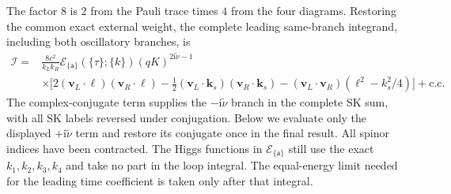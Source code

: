 \documentclass[a4paper,12pt]{article}
\newcommand{\ii}{\mathrm i}
\newcommand{\mb}{\mathbf}
\newcommand{\tn}{\tilde\nu}
\def\aa{\mathsf a}
\newcommand{\bk}{\mb k}
\begin{document}
The factor $8$ is $2$ from the Pauli trace times $4$ from the four
diagrams. Restoring the common exact external weight, the complete
leading same-branch integrand, including both oscillatory branches, is
\begin{align}
 \mathcal I
 ={}&\frac{8c^2}{k_Lk_R}\mathcal E_{\{\aa\}}(\{\tau\};\{k\})
 (qK)^{2\ii\tn-1}\nonumber\\
 &\times\Big[
 2(\mb v_L\cdot\bm\ell)(\mb v_R\cdot\bm\ell)
 -\tfrac12(\mb v_L\cdot\bk_s)(\mb v_R\cdot\bk_s)
 -(\mb v_L\cdot\mb v_R)(\ell^2-k_s^2/4)\Big]
 +\mathrm{c.c.}
 \label{eq:complete-direct-integrand}
\end{align}
The complex-conjugate term supplies the $-\ii\tn$ branch in the complete
SK sum, with all SK labels reversed under conjugation. Below we evaluate
only the displayed $+\ii\tn$ term and restore its conjugate once in the
final result.
All spinor indices have been contracted. The Higgs functions in
$\mathcal E_{\{\aa\}}$ still use the exact $k_1,k_2,k_3,k_4$ and take
no part in the loop integral. The equal-energy limit needed for the
leading time coefficient is taken only after that integral.
\end{document}
